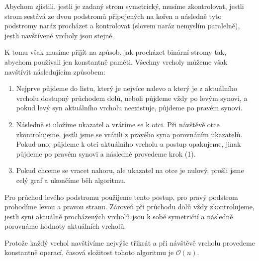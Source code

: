 \documentclass{fkssolpub}
\author{Ondřej Sedláček}
\begin{document}
Abychom zjistili, jestli je zadaný strom symetrický, musíme zkontrolovat, jestli
strom sestává ze dvou podstromů připojených na kořen a následně tyto podstromy
naráz procházet a kontrolovat (slovem naráz nemyslím paralelně), jestli navštívené vrcholy jsou stejné.

K tomu však musíme přijít na způsob, jak procházet binární stromy tak, abychom
používali jen konstantně paměti. Všechny vrcholy můžeme však navštívit
následujícím způsobem:

\begin{enumerate}
	\item Nejprve půjdeme do listu, který je nejvíce nalevo a který je z aktuálního
	      vrcholu dostupný průchodem dolů, neboli půjdeme vždy po
	      levým synovi, a pokud levý syn aktuálního vrcholu neexistuje, půjdeme po
	      pravém synovi.
	\item Následně si uložíme ukazatel a vrátíme se k otci. Při návštěvě otce
	      zkontrolujeme, jestli jsme se vrátili z pravého syna porovnáním ukazatelů.
	      Pokud ano, půjdeme k otci aktuálního vrcholu a postup opakujeme, jinak
	      půjdeme po pravém synovi a následně provedeme krok (1).
	\item Pokud chceme se vracet nahoru, ale ukazatel na otce je nulový,
	      prošli jsme celý graf a ukončíme běh algoritmu.
\end{enumerate}

Pro průchod levého podstromu použijeme tento postup, pro pravý podstrom prohodíme
levou a pravou stranu. Zároveň při průchodu dolů vždy zkontrolujeme, jestli syni
aktuálně procházených vrcholů jsou k sobě symetričtí a následně porovnáme hodnoty
aktuálních vrcholů.

Protože každý vrchol navštívíme nejvýše třikrát a při návštěvě vrcholu provedeme
konstantně operací, časová složitost tohoto algoritmu je $\mathcal{O}(n)$.
\end{document}

